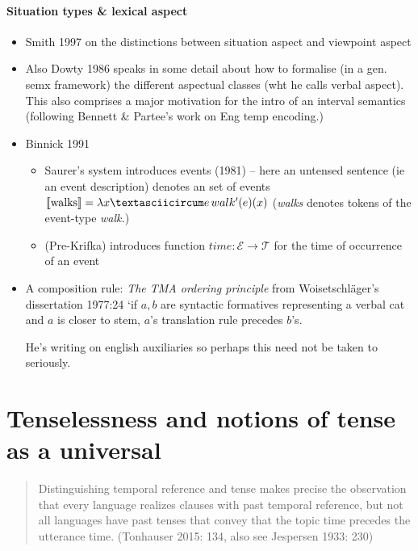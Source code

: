 \documentclass[10pt]{article}
\newcommand{\denote}[1]{\mbox{$[\![\mbox{#1}]\!]$}}
\begin{document}
\subsection{Situation types \& lexical aspect}
\begin{itemize}

	\item Smith 1997 on the distinctions between situation aspect and viewpoint aspect
	\item Also Dowty 1986 speaks in some detail about how to formalise (in a gen. semx framework) the different aspectual classes (wht he calls verbal aspect). This also comprises a major motivation for the intro of an interval semantics (following Bennett \& Partee's work on Eng temp encoding.)
	\item Binnick 1991
	\begin{itemize}
		\item Saurer's system introduces events (1981) -- here an untensed sentence (ie an event description) denotes an set of events $\denote{walks}=\lambda x\textasciicircum e\,walk'(e)(x) $ (\textit{walks} denotes tokens of the event-type \textit{walk.})
		\item (Pre-Krifka) introduces function $ time:\mathcal E\to\mathcal T $ for the time of occurrence of an event
	\end{itemize}
\item A composition rule: \textit{The TMA ordering principle} from Woisetschläger's dissertation 1977:24 `if $ a,b $ are syntactic formatives representing a verbal cat and $ a $ is closer to stem, $ a $'s translation rule precedes $ b $'s. 

He's writing on english auxiliaries so perhaps this need not be taken to seriously.
\end{itemize}

\setcounter{section}{-1}
\newpage\part{Tenselessness and notions of tense as a universal}
\begin{quotation}
	Distinguishing temporal reference and tense makes precise the observation that every language realizes clauses with past temporal reference, but not all languages have past tenses that convey that the topic time precedes the utterance time. \hfill(Tonhauser 2015: 134, also see Jespersen 1933: 230)
\end{quotation}
\end{document}
